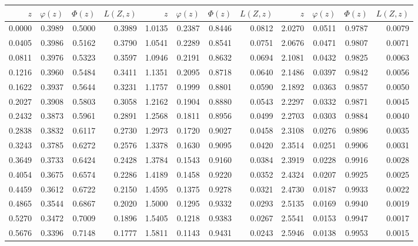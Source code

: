 \documentclass[
]{article}
\begin{document}
\begin{table}[H]
\centering
\begin{tabular}{r|r|r|>{}r||r|r|r|>{}r||r|r|r|r}
\hline
$z$ & $\varphi(z)$ & $\Phi(z)$ & $L(Z,z)$ & $z$ & $\varphi(z)$ & $\Phi(z)$ & $L(Z,z)$ & $z$ & $\varphi(z)$ & $\Phi(z)$ & $L(Z,z)$\\
\hline
0.0000 & 0.3989 & 0.5000 & 0.3989 & 1.0135 & 0.2387 & 0.8446 & 0.0812 & 2.0270 & 0.0511 & 0.9787 & 0.0079\\
\hline
0.0405 & 0.3986 & 0.5162 & 0.3790 & 1.0541 & 0.2289 & 0.8541 & 0.0751 & 2.0676 & 0.0471 & 0.9807 & 0.0071\\
\hline
0.0811 & 0.3976 & 0.5323 & 0.3597 & 1.0946 & 0.2191 & 0.8632 & 0.0694 & 2.1081 & 0.0432 & 0.9825 & 0.0063\\
\hline
0.1216 & 0.3960 & 0.5484 & 0.3411 & 1.1351 & 0.2095 & 0.8718 & 0.0640 & 2.1486 & 0.0397 & 0.9842 & 0.0056\\
\hline
0.1622 & 0.3937 & 0.5644 & 0.3231 & 1.1757 & 0.1999 & 0.8801 & 0.0590 & 2.1892 & 0.0363 & 0.9857 & 0.0050\\
\hline
0.2027 & 0.3908 & 0.5803 & 0.3058 & 1.2162 & 0.1904 & 0.8880 & 0.0543 & 2.2297 & 0.0332 & 0.9871 & 0.0045\\
\hline
0.2432 & 0.3873 & 0.5961 & 0.2891 & 1.2568 & 0.1811 & 0.8956 & 0.0499 & 2.2703 & 0.0303 & 0.9884 & 0.0040\\
\hline
0.2838 & 0.3832 & 0.6117 & 0.2730 & 1.2973 & 0.1720 & 0.9027 & 0.0458 & 2.3108 & 0.0276 & 0.9896 & 0.0035\\
\hline
0.3243 & 0.3785 & 0.6272 & 0.2576 & 1.3378 & 0.1630 & 0.9095 & 0.0420 & 2.3514 & 0.0251 & 0.9906 & 0.0031\\
\hline
0.3649 & 0.3733 & 0.6424 & 0.2428 & 1.3784 & 0.1543 & 0.9160 & 0.0384 & 2.3919 & 0.0228 & 0.9916 & 0.0028\\
\hline
0.4054 & 0.3675 & 0.6574 & 0.2286 & 1.4189 & 0.1458 & 0.9220 & 0.0352 & 2.4324 & 0.0207 & 0.9925 & 0.0025\\
\hline
0.4459 & 0.3612 & 0.6722 & 0.2150 & 1.4595 & 0.1375 & 0.9278 & 0.0321 & 2.4730 & 0.0187 & 0.9933 & 0.0022\\
\hline
0.4865 & 0.3544 & 0.6867 & 0.2020 & 1.5000 & 0.1295 & 0.9332 & 0.0293 & 2.5135 & 0.0169 & 0.9940 & 0.0019\\
\hline
0.5270 & 0.3472 & 0.7009 & 0.1896 & 1.5405 & 0.1218 & 0.9383 & 0.0267 & 2.5541 & 0.0153 & 0.9947 & 0.0017\\
\hline
0.5676 & 0.3396 & 0.7148 & 0.1777 & 1.5811 & 0.1143 & 0.9431 & 0.0243 & 2.5946 & 0.0138 & 0.9953 & 0.0015\\

\end{tabular}
\end{table}
\end{document}
